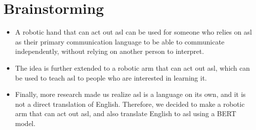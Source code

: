 \part{Brainstorming}

\begin{itemize}
    \item A robotic hand that can act out \gls{asl} can be used for someone who relies on \gls{asl} as their primary communication language to be able to communicate independently, without relying on another person to interpret.
    \item The idea is further extended to a robotic arm that can act out \gls{asl}, which can be used to teach \gls{asl} to people who are interested in learning it.
    \item Finally, more research made us realize \gls{asl} is a language on its own, and it is not a direct translation of English. Therefore, we decided to make a robotic arm that can act out \gls{asl}, and also translate English to \gls{asl} using a BERT model.
\end{itemize}
